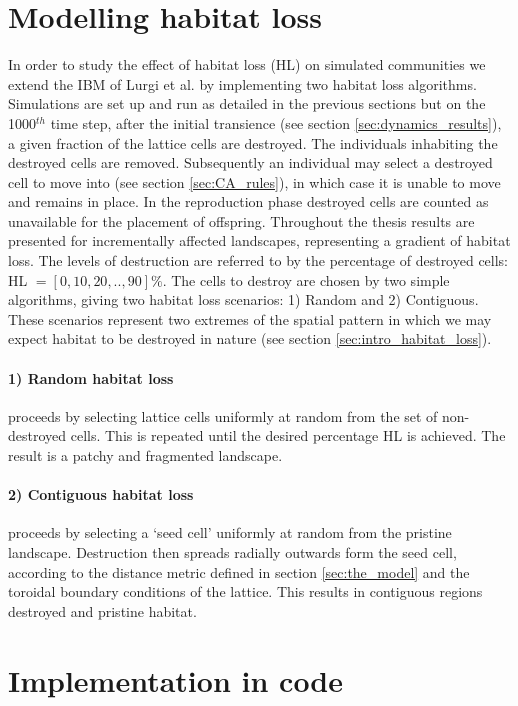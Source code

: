 \section{Modelling habitat loss}
\label{sec:model_HL}

In order to study the effect of habitat loss (HL) on simulated communities we extend the IBM of Lurgi et al. \cite{lurgi2015effects} by implementing two habitat loss algorithms. Simulations are set up and run as detailed in the previous sections but on the 1000$^{th}$ time step, after the initial transience (see section \ref{sec:dynamics_results}), a given fraction of the lattice cells are destroyed. The individuals inhabiting the destroyed cells are removed. Subsequently an individual may select a destroyed cell to move into (see section \ref{sec:CA_rules}), in which case it is unable to move and remains in place. In the reproduction phase destroyed cells are counted as unavailable for the placement of offspring. Throughout the thesis results are presented for incrementally affected landscapes, representing a gradient of habitat loss. The levels of destruction are referred to by the percentage of destroyed cells: HL $=[0,10,20,..,90] \%$. The cells to destroy are chosen by two simple algorithms, giving two habitat loss scenarios: 1) Random and 2) Contiguous. These scenarios represent two extremes of the spatial pattern in which we may expect habitat to be destroyed in nature (see section \ref{sec:intro_habitat_loss}).

\paragraph*{1) Random habitat loss} proceeds by selecting lattice cells uniformly at random from the set of non-destroyed cells. This is repeated until the desired percentage HL is achieved. The result is a patchy and fragmented landscape.  

\paragraph*{2) Contiguous habitat loss} proceeds by selecting a `seed cell' uniformly at random from the pristine landscape. Destruction then spreads radially outwards form the seed cell, according to the distance metric defined in section \ref{sec:the_model} and the toroidal boundary conditions of the lattice. This results in contiguous regions destroyed and pristine habitat.
 

\section{Implementation in code}
\label{sec:implementation}

